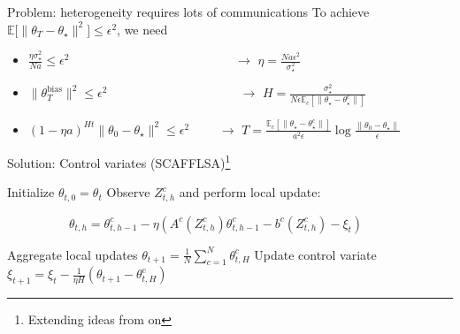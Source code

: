 \documentclass[aspectratio=169,14pt]{beamer}
\begin{document}
\begin{frame}{Problem: heterogeneity requires lots of communications}
  To achieve $\mathbb{E} \Big[ \| {\theta_T - \theta_\star} \|^2 \Big] \le \epsilon^2$, we need
  \begin{itemize}
  \item $\frac{\eta \sigma_\star^2}{N a} \le \epsilon^2$ ~~~~~~\,~~~~~~~~~~~~~~~~~~~ $\rightarrow$ $\eta = \frac{N a \epsilon^2}{\sigma_\star^2}$
  \item $\| \theta_T^{\text{bias}} \|^2 \le \epsilon^2$ ~~~~~~~~~~~~~~~~~~~~ $\rightarrow$ $H = \frac{\sigma_\star^2 }{N \epsilon \mathbb{E}_c[\| \theta_\star - \theta_\star^c \| ]}$
  \item $(1 - \eta a)^{H t} \| \theta_0 - \theta_\star \|^2 \le \epsilon^2$ ~~~~$\rightarrow$ $T = \frac{\mathbb{E}_c[\| \theta_\star - \theta_\star^c \|]}{a^2 \epsilon} \log \tfrac{\| \theta_0 - \theta_\star \|}{ \epsilon }$
  \end{itemize}
\end{frame}


\begin{frame}{Solution: Control variates (SCAFFLSA)\footnote{Extending ideas from on }}

  \vspace{-0.5em}
  
  \begin{algorithmic}
    \State Initialize $\theta_{t,0} = \theta_t$
    \State Observe $Z^c_{t,h}$ and perform local update:
    \begin{center}
      ~~~~~~~~~~$\theta_{t,h} = \theta_{t,h-1}^c - \eta( A^c(Z^c_{t,h}) \theta_{t,h-1}^c - b^c(Z^c_{t,h}) - \xi_t)$
    \end{center}
  \vspace{-0.2em}
    \EndFor
  \vspace{-0.2em}
    \EndFor
    \State Aggregate local updates $\theta_{t+1} = \tfrac{1}{N} \sum\nolimits_{c=1}^{N} \theta_{t,H}^c $
    \State Update control variate $\xi_{t+1} = \xi_t - \frac{1}{\eta H} ( \theta_{t+1} - \theta_{t,H}^c )$
    \EndFor
  \end{algorithmic}    
  \vspace{.2em}
\end{frame}
\end{document}
